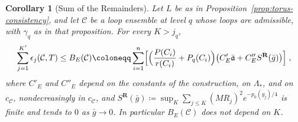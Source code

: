 \documentclass[11pt]{preprint}
\numberwithin{equation}{section}
\newtheorem{corollary}[theorem]{Corollary}
\theoremstyle{definition}
\theoremstyle{remark}
\theoremstyle{plain}
\begin{document}
\begin{corollary}[Sum of the Remainders]\label{cor:remainder-sum}
Let $L$ be as in Proposition~\ref{prop:torus-consistency}, and let $\mathcal C$ be a loop ensemble at level $q$ whose loops are admissible, with $\gamma_q$ as in that proposition. For every $K > j_q$,
\begin{equation}\label{eq:remainder-sum}
    \sum_{j=1}^{K'}\epsilon_j(\mathcal C, T) \leq B_E(\mathcal C) \coloneqq \sum_{i=1}^{n}\Bigl[\Bigl(\frac{P(C_i)}{r(C_i)} + P_q(C_i)\Bigr)\bigl(C'_E\bar{\mathfrak a} + C''_ES^{\mathbf R}(\bar g)\bigr)\Bigr]\;,
\end{equation}
where $C'_E$ and $C''_E$ depend on the constants of the construction, on $\Lambda_*$, and on $c_{\mathcal C}$, nondecreasingly in $c_{\mathcal C}$, and $S^{\mathbf R}(\bar g) \coloneqq \sup_K\sum_{j \leq K}(MR_j)^2e^{-p_0(g_j)/4}$ is finite and tends to $0$ as $\bar g \to 0$. In particular $B_E(\mathcal C)$ does not depend on $K$.
\end{corollary}
\end{document}
